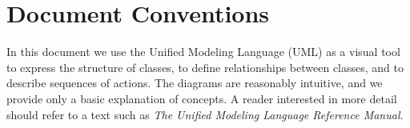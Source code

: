 \section{Document Conventions}
\label{sec:conventions}

In this document we use the Unified Modeling Language (UML) as a visual tool 
to express the structure of 
classes, to define relationships between classes, and to describe sequences
of actions.  The diagrams are reasonably intuitive, and we provide 
only a basic explanation of concepts.  A reader interested in more detail should 
refer to a text such as {\it The Unified Modeling Language Reference Manual.}
 \cite{uml}





